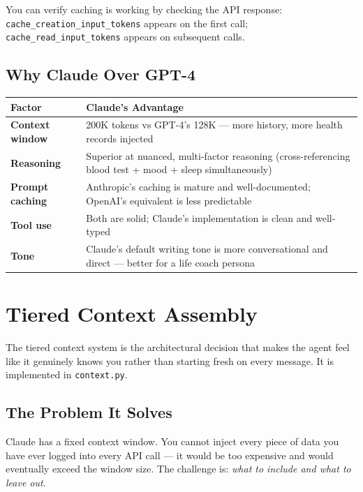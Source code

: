 \documentclass[12pt, a4paper]{article}
\begin{document}
You can verify caching is working by checking the API response: \texttt{cache\_creation\_input\_tokens} appears on the first call; \texttt{cache\_read\_input\_tokens} appears on subsequent calls.

\subsection{Why Claude Over GPT-4}

\begin{longtable}{>{\bfseries}p{4cm} p{10cm}}
\toprule
Factor & Claude's Advantage \\
\midrule
Context window & 200K tokens vs GPT-4's 128K --- more history, more health records injected \\
\addlinespace
Reasoning & Superior at nuanced, multi-factor reasoning (cross-referencing blood test + mood + sleep simultaneously) \\
\addlinespace
Prompt caching & Anthropic's caching is mature and well-documented; OpenAI's equivalent is less predictable \\
\addlinespace
Tool use & Both are solid; Claude's implementation is clean and well-typed \\
\addlinespace
Tone & Claude's default writing tone is more conversational and direct --- better for a life coach persona \\
\bottomrule
\end{longtable}

\section{Tiered Context Assembly}

The tiered context system is the architectural decision that makes the agent feel like it genuinely knows you rather than starting fresh on every message. It is implemented in \texttt{context.py}.

\subsection{The Problem It Solves}

Claude has a fixed context window. You cannot inject every piece of data you have ever logged into every API call --- it would be too expensive and would eventually exceed the window size. The challenge is: \textit{what to include and what to leave out}.
\end{document}
